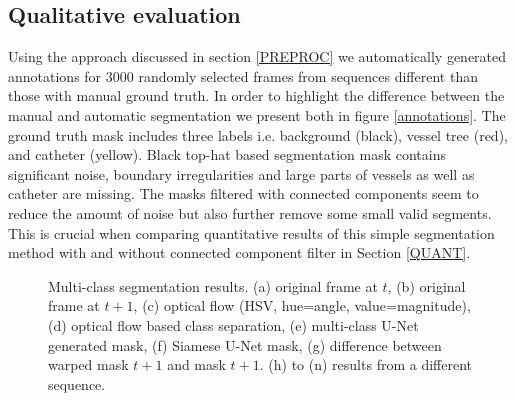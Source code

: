 \documentclass{bmvc2k}
\begin{document}
\subsection{Qualitative evaluation}\label{QUAL}
Using the approach discussed in section \ref{PREPROC} we automatically generated annotations for  3000 randomly selected frames from sequences different than those with manual ground truth. 
In order to highlight the difference between the  manual and automatic segmentation we present both in figure \ref{annotations}. The ground truth mask includes three labels i.e. background (black), vessel tree (red), and catheter (yellow). Black top-hat based segmentation mask contains significant noise, boundary irregularities and large parts of vessels as well as catheter are missing. The masks filtered with connected components seem to reduce the amount of noise but also further remove some small valid segments. This is crucial when comparing quantitative results of this simple segmentation method with and without connected component filter in Section \ref{QUANT}.  



\begin{figure}[h]
\begin{adjustbox}{width=.9\textwidth}
\end{adjustbox}
\begin{adjustbox}{width=.9\textwidth}
	\caption{
		Multi-class segmentation results.  (a) original frame at $t$, (b) original frame at $t+1$, (c) optical flow (HSV, hue=angle, value=magnitude), (d) optical flow based class separation,  (e) multi-class U-Net generated mask, (f) Siamese U-Net mask, (g) difference between warped mask $t+1$ and mask $t+1$. (h) to (n) results from a different sequence.}
	\label{Multi_Seg}
\end{adjustbox}
\end{figure}
\end{document}

